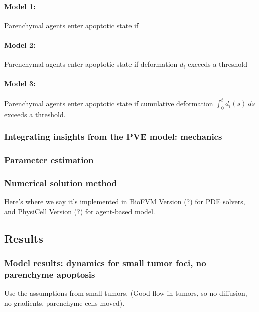 \documentclass[smallextended,natbib]{svjour3}
\begin{document}
\paragraph{Model 1:} Parenchymal agents enter apoptotic state if 

\paragraph{Model 2:} Parenchymal agents enter apoptotic state if deformation $d_i$ exceeds a threshold 

\paragraph{Model 3:} Parenchymal agents enter apoptotic state if cumulative deformation 
$\int_0^t d_i(s)\: ds$ exceeds a threshold. 




\subsubsection{Integrating insights from the PVE model: mechanics}





\subsubsection{Parameter estimation}

\subsubsection{Numerical solution method} Here's where we say it's implemented in 
BioFVM Version (?) for PDE solvers, and PhysiCell Version (?) for agent-based model. 


\subsection{Results}

\subsubsection{Model results: dynamics for small tumor foci, no parenchyme apoptosis}
Use the assumptions from small tumors. (Good flow in tumors, so no diffusion, no gradients, parenchyme cells moved). 
\end{document}
